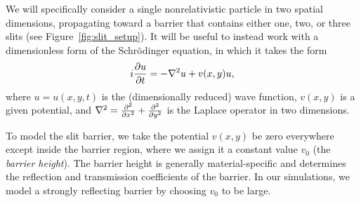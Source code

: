 \documentclass[aps,pra,reprint,amsmath,amssymb,twocolumn,preprintnumbers,superscriptaddress,10pt]{revtex4-2}
\begin{document}
We will specifically consider a single nonrelativistic particle in two spatial dimensions, propagating toward a barrier that contains either one, two, or three slits (see Figure~\ref{fig:slit_setup}).
It will be useful to instead work with a dimensionless form of the Schr\"odinger equation, in which it takes the form
\begin{align} \label{eq:schrodinger_equation}
   i \pdv{u}{t} = -\nabla^2 u + v(x,y) u,
\end{align}
where $u = u(x,y,t)$ is the (dimensionally reduced) wave function, $v(x,y)$ is a given potential, and $\nabla^2 = \pdv[2]{}{x} + \pdv[2]{}{y}$ is the Laplace operator in two dimensions.

To model the slit barrier, we take the potential \(v(x,y)\) be zero everywhere except inside the barrier region, where we assign it a constant value $v_0$ (the \emph{barrier height}).
The barrier height is generally material-specific and determines the reflection and transmission coefficients of the barrier.
In our simulations, we model a strongly reflecting barrier by choosing \(v_0\) to be large.
\end{document}
